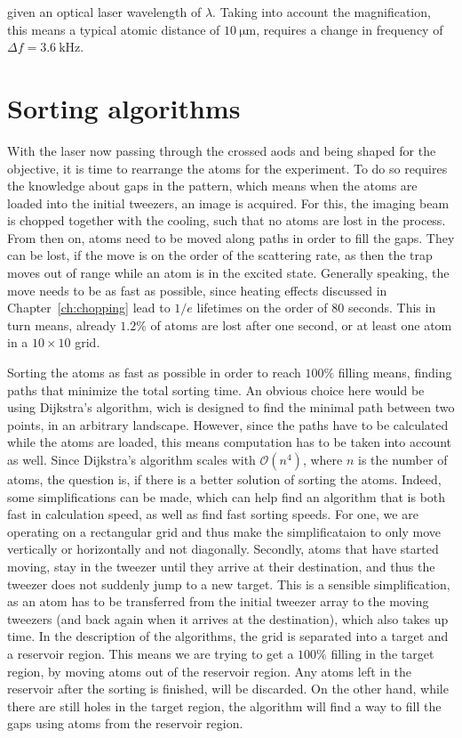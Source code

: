 given an optical laser wavelength of $\lambda$. Taking into account the magnification, this means a typical atomic distance of $\SI{10}{\micro\meter}$, requires a change in frequency of $\Delta f = \SI{3.6}{\kilo\hertz}$.

\section{Sorting algorithms}

With the laser now passing through the crossed \acp{aod} and being shaped for the objective, it is time to rearrange the atoms for the experiment. To do so requires the knowledge about gaps in the pattern, which means when the atoms are loaded into the initial tweezers, an image is acquired. For this, the imaging beam is chopped together with the cooling, such that no atoms are lost in the process. From then on, atoms need to be moved along paths in order to fill the gaps. They can be lost, if the move is on the order of the scattering rate, as then the trap moves out of range while an atom is in the excited state. Generally speaking, the move needs to be as fast as possible, since heating effects discussed in Chapter~\ref{ch:chopping} lead to $1/e$ lifetimes on the order of 80 seconds. This in turn means, already $1.2\%$ of atoms are lost after one second, or at least one atom in a $10\times10$ grid.

Sorting the atoms as fast as possible in order to reach $100\%$ filling means, finding paths that minimize the total sorting time. An obvious choice here would be using Dijkstra's algorithm, wich is designed to find the minimal path between two points, in an arbitrary landscape. However, since the paths have to be calculated while the atoms are loaded, this means computation has to be taken into account as well. Since Dijkstra's algorithm scales with $\mathcal{O}(n^4)$, where $n$ is the number of atoms, the question is, if there is a better solution of sorting the atoms. Indeed, some simplifications can be made, which can help find an algorithm that is both fast in calculation speed, as well as find fast sorting speeds.
For one, we are operating on a rectangular grid and thus make the simplificataion to only move vertically or horizontally and not diagonally. Secondly, atoms that have started moving, stay in the tweezer until they arrive at their destination, and thus the tweezer does not suddenly jump to a new target. This is a sensible simplification, as an atom has to be transferred from the initial tweezer array to the moving tweezers (and back again when it arrives at the destination), which also takes up time. In the description of the algorithms, the grid is separated into a target and a reservoir region. This means we are trying to get a $100\%$ filling in the target region, by moving atoms out of the reservoir region. Any atoms left in the reservoir after the sorting is finished, will be discarded. On the other hand, while there are still holes in the target region, the algorithm will find a way to fill the gaps using atoms from the reservoir region.

